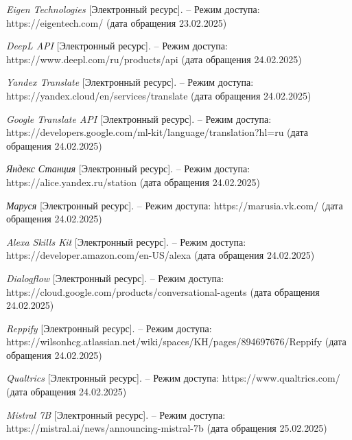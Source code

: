 \begin{thebibliography}{}
	\textit{Eigen Technologies} [Электронный ресурс]. --
	Режим доступа: https://eigentech.com/ (дата обращения 23.02.2025)

	\textit{DeepL API} [Электронный ресурс]. --
	Режим доступа: https://www.deepl.com/ru/products/api (дата обращения 24.02.2025)

	\textit{Yandex Translate} [Электронный ресурс]. --
	Режим доступа: https://yandex.cloud/en/services/translate (дата обращения 24.02.2025)

	\textit{Google Translate API} [Электронный ресурс]. --
	Режим доступа: https://developers.google.com/ml-kit/language/translation?hl=ru (дата обращения 24.02.2025)

	\textit{Яндекс Станция} [Электронный ресурс]. --
	Режим доступа: https://alice.yandex.ru/station (дата обращения 24.02.2025)

	\textit{Маруся} [Электронный ресурс]. --
	Режим доступа: https://marusia.vk.com/ (дата обращения 24.02.2025)

	\textit{Alexa Skills Kit} [Электронный ресурс]. --
	Режим доступа: https://developer.amazon.com/en-US/alexa (дата обращения 24.02.2025)

	\textit{Dialogflow} [Электронный ресурс]. --
	Режим доступа: https://cloud.google.com/products/conversational-agents (дата обращения 24.02.2025)

	\textit{Reppify} [Электронный ресурс]. --
	Режим доступа: https://wilsonhcg.atlassian.net/wiki/spaces/KH/pages/894697676/Reppify (дата обращения 24.02.2025)

	\textit{Qualtrics} [Электронный ресурс]. --
	Режим доступа: https://www.qualtrics.com/ (дата обращения 24.02.2025)
	
	\textit{Mistral 7B} [Электронный ресурс]. --
	Режим доступа: https://mistral.ai/news/announcing-mistral-7b (дата обращения 25.02.2025)



\end{thebibliography}